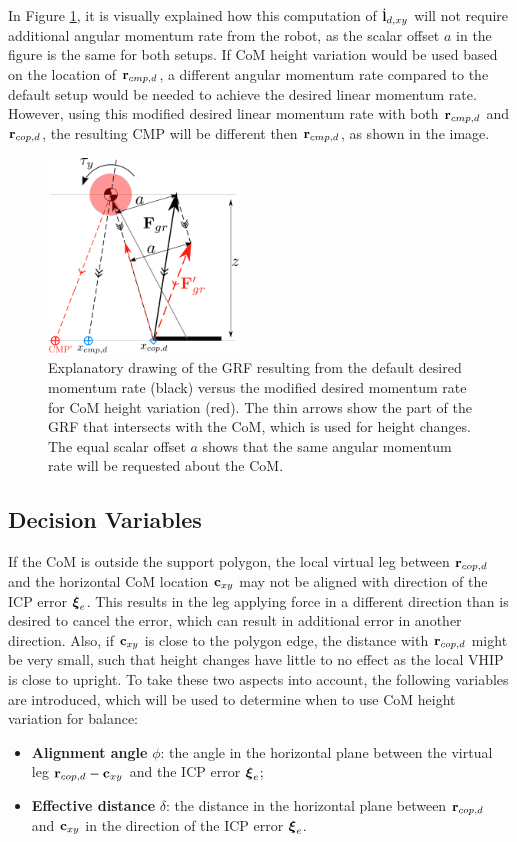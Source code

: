 In Figure \ref{fig:rcopdvsrcmpd}, it is visually explained how this computation of $\dot{\mathbf{l}}_{d,xy}$ will not require additional angular momentum rate from the robot, as the scalar offset $a$ in the figure is the same for both setups. If \ac{CoM} height variation would be used based on the location of $\mathbf{r}_{cmp,d}$, a different angular momentum rate compared to the default setup would be needed to achieve the desired linear momentum rate. However, using this modified desired linear momentum rate with both $\mathbf{r}_{cmp,d}$ and $\mathbf{r}_{cop,d}$, the resulting \ac{CMP} will be different then $\mathbf{r}_{cmp,d}$, as shown in the image. 

\begin{figure}
\centering
\includegraphics[width=0.45\textwidth]{STYLESTUFF/2DControlStrategyViz.png}
\caption{Explanatory drawing of the \ac{GRF} resulting from the default desired momentum rate (black) versus the modified desired momentum rate for \ac{CoM} height variation (red). The thin arrows show the part of the \ac{GRF} that intersects with the \ac{CoM}, which is used for height changes. The equal scalar offset $a$ shows that the same angular momentum rate will be requested about the \ac{CoM}.}
\label{fig:rcopdvsrcmpd}
\end{figure}
\subsection{Decision Variables}
If the \ac{CoM} is outside the support polygon, the local virtual leg between $\mathbf{r}_{cop,d}$ and the horizontal \ac{CoM} location $\mathbf{c}_{xy}$ may not be aligned with direction of the \ac{ICP} error $\boldsymbol{\xi}_e$. This results in the leg applying force in a different direction than is desired to cancel the error, which can result in additional error in another direction. Also, if $\mathbf{c}_{xy}$ is close to the polygon edge, the distance with $\mathbf{r}_{cop,d}$ might be very small, such that height changes have little to no effect as the local \ac{VHIP} is close to upright. To take these two aspects into account, the following variables are introduced, which will be used to determine when to use \ac{CoM} height variation for balance:
\begin{itemize}
	\item \textbf{Alignment angle} $\phi$: the angle in the horizontal plane between the virtual leg $\mathbf{r}_{cop,d}-\mathbf{c}_{xy}$ and the \ac{ICP} error $\boldsymbol{\xi}_e$;
	\item \textbf{Effective distance} $\delta$: the distance in the horizontal plane between $\mathbf{r}_{cop,d}$ and $\mathbf{c}_{xy}$ in the direction of the \ac{ICP} error $\boldsymbol{\xi}_e$.
\end{itemize}

